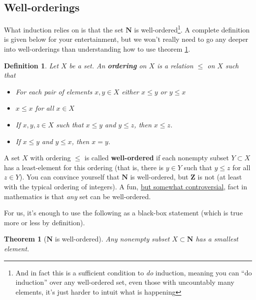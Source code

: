 \documentclass[12pt]{article}
\numberwithin{equation}{subsection}
\newtheorem{thm}[subsection]{Theorem}
\newtheorem{defn}[subsection]{Definition}
\theoremstyle{note}
\begin{document}
\subsection{Well-orderings}
What induction relies on is that the set $\mathbf{N}$ is well-ordered\footnote{And in fact this is a sufficient condition to \textit{do} induction, meaning you can ``do induction'' over any well-ordered set, even those with uncountably many elements, it's just harder to intuit what is happening}. A complete definition is given below for your entertainment, but we won't really need to go any deeper into well-orderings than understanding how to use theorem \ref{well-ord}. 

\begin{defn}Let $X$ be a set. An \textbf{ordering} on $X$ is a relation $\leq$ on $X$ such that~\begin{itemize}
\item For each pair of elements $x,y\in X$ either $x\leq y$ or $y\leq x$
\item $x\leq x$ for all $x\in X$
\item If $x,y,z\in X$ such that $x\leq y$ and $y\leq z$, then $x\leq z$.
\item If $x\leq y$ and $y\leq x$, then $x=y$. 
\end{itemize}
\end{defn}
 
A set $X$ with ordering $\leq$ is called \textbf{well-ordered} if each nonempty subset $Y\subset X$ has a least-element for this ordering (that is, there is $y\in Y$ such that $y\leq z$ for all $z\in Y$). You can convince yourself that $\mathbf{N}$ is well-ordered, but $\mathbf{Z}$ is not (at least with the typical ordering of integers). A fun, \href{https://en.wikipedia.org/wiki/Constructivism_(philosophy_of_mathematics)}{but somewhat controversial}, fact in mathematics is that \textit{any} set can be well-ordered. 

For us, it's enough to use the following as a black-box statement (which is true more or less by definition). 

\begin{thm}[$\mathbf{N}$ is well-ordered]\label{well-ord}
	Any nonempty subset $X\subset \mathbf{N}$ has a smallest element. 

\end{thm}
\end{document}
